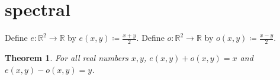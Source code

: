 \documentclass{article}
\newtheorem{theorem}{Theorem}
\begin{document}
\section{spectral}
Define $e:\mathbb{R}^2\to\mathbb{R}$ by $e(x,y)\coloneqq\frac{x+y}{2}$.
Define $o:\mathbb{R}^2\to\mathbb{R}$ by $o(x,y)\coloneqq\frac{x-y}{2}$.
\begin{theorem}\label{thm:RS02}
For all real numbers $x,y$, $e(x,y)+o(x,y)=x$ and $e(x,y)-o(x,y)=y$.
\end{theorem}
\end{document}

